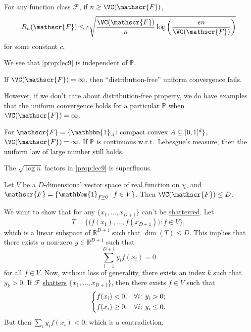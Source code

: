 \begin{proposition}\label{prop:lec9}
  For any function class \(\mathscr{F} \), if \(n \geq \VC(\mathscr{F} ) \),
  \[
    R_n(\mathscr{F} ) \leq c \sqrt{\frac{\VC(\mathscr{F} ) }{n} \log \left( \frac{en}{\VC(\mathscr{F} ) } \right) }
  \]
  for some constant \(c\).
\end{proposition}

\begin{remark}
  We see that \autoref{prop:lec9} is independent of \(\mathbb{P} \).
\end{remark}

\begin{remark}
  If \(\VC(\mathscr{F} ) = \infty \), then ``distribution-free'' uniform convergence fails.
\end{remark}

However, if we don't care about distribution-free property, we do have examples that the uniform convergence holds for a particular \(\mathbb{P} \) when \(\VC(\mathscr{F} ) = \infty \).

\begin{eg}
  For \(\mathscr{F} = \{ \mathbbm{1}_{A} \colon \text{compact convex } A \subseteq [0, 1]^d \} \), \(\VC(\mathscr{F} ) = \infty \). If \(\mathbb{P} \) is continuous w.r.t.\ Lebesgue's measure, then the uniform law of large number still holds.
\end{eg}

\begin{remark}
  The \(\sqrt{\log n} \) factors in \autoref{prop:lec9} is superfluous.
\end{remark}

\begin{eg}
  Let \(V\) be a \(D\)-dimensional vector space of real function on \(\chi \), and \(\mathscr{F} = \{ \mathbbm{1}_{f\geq 0} \colon f \in V\} \). Then \(\VC(\mathscr{F} ) \leq D\).
\end{eg}
\begin{explanation}
  We want to show that for any \(\{ x_1, \dots , x_{D+1} \} \) can't be \hyperref[def:shatter]{shatterred}. Let
  \[
    T = \{ \big( f(x_1), \dots , f(x_{D+1}) \big) \colon f\in V \},
  \]
  which is a linear subspace of \(\mathbb{R} ^{D+1}\) such that \(\dim (T) \leq D\). This implies that there exists a non-zero \(y \in \mathbb{R} ^{D+1}\) such that
  \[
    \sum_{i=1}^{D+1} y_i f(x_i) = 0
  \]
  for all \(f\in V\). Now, without loss of generality, there exists an index \(k\) such that \(y_k > 0\). If \(\mathscr{F} \) \hyperref[def:shatter]{shatters} \(\{ x_1, \dots , x_{D+1} \} \), then there exists \(f\in V\) such that
  \[
    \begin{dcases}
      f(x_i) < 0,    & \forall i\colon y_i > 0  ;  \\
      f(x_i) \geq 0, & \forall i\colon y_i \leq 0.
    \end{dcases}
  \]
  But then \(\sum_{i} y_i f(x_i) < 0\), which is a contradiction.
\end{explanation}

